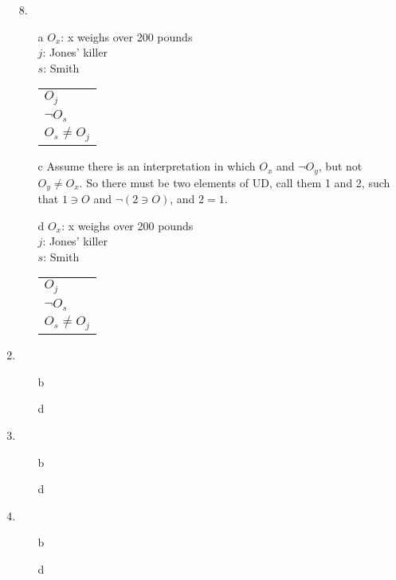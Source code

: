 \documentclass{article}
\begin{document}
\begin{enumerate}
\begin{enumerate}
			\end{enumerate}
		\item[8.]
			\begin{enumerate}
				\item[a]
					$O_x$: x weighs over 200 pounds\\
					$j$: Jones' killer\\
					$s$: Smith\\
					\begin{tabular}{l}
						$O_j$\\
						$\lnot O_s$\\ \hline
						$O_s \neq O_j$\\
					\end{tabular}
				\item[c]
					Assume there is an interpretation in which $O_x$ and $\lnot O_y$, but not $O_y \neq O_x$. So there must be two elements of UD, call them 1 and 2, such that $1 \ni O$ and $\lnot (2 \ni O)$, and $2 = 1$. 
				\item[d]
					$O_x$: x weighs over 200 pounds\\
					$j$: Jones' killer\\
					$s$: Smith\\
					\begin{tabular}{l}
						$O_j$\\
						$\lnot O_s$\\ \hline
						$O_s \neq O_j$\\
					\end{tabular}


			\end{enumerate}
		\item
			\begin{enumerate}
				\item[b]
				\item[d]
			\end{enumerate}
		\item
			\begin{enumerate}
				\item[b]
				\item[d]
			\end{enumerate}
		\item
			\begin{enumerate}
				\item[b]
				\item[d]
			\end{enumerate}
	\end{enumerate}
\end{document}
